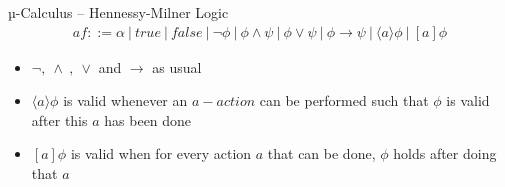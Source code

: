 \documentclass[aspectratio=1610]{beamer}
\begin{document}
  \begin{frame}{µ-Calculus – Hennessy-Milner Logic}
    \begin{align*}
      af ::= \alpha\ |\ true\ |\ false\ |\ \neg \phi\ |\ \phi \land \psi\ |\ \phi \lor \psi\ |\ \phi \to \psi\ |\ \langle a \rangle \phi \ |\ [a]\phi
    \end{align*}
    \begin{itemize}
      \item $\neg ,\ \land\ ,\ \lor$ and $\to$ as usual
      \item $\langle a \rangle \phi$ is valid whenever an $a-action$ can be performed such that $\phi$ is valid after this $a$ has been done
      \item $[a]\phi$ is valid when for every action $a$ that can be done, $\phi$ holds after doing that $a$
    \end{itemize}
  \end{frame}
\end{document}
